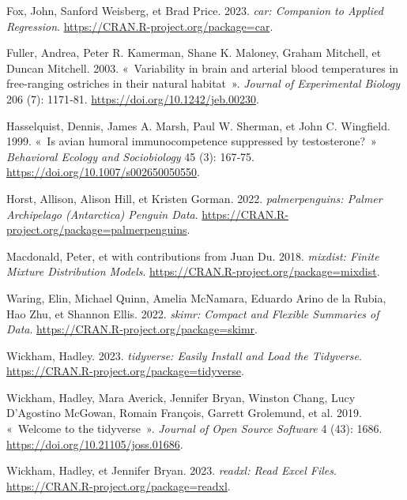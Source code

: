 \documentclass[
  a4paper,
  DIV=11,
  numbers=noendperiod,
  oneside]{scrreprt}
\newlength{\cslhangindent}
\newlength{\cslentryspacingunit} %
\newenvironment{CSLReferences}[2] %
 {%
  \setlength{\parindent}{0pt}
  \ifodd #1
  \let\oldpar\par
  \def\par{\hangindent=\cslhangindent\oldpar}
  \fi
  \setlength{\parskip}{#2\cslentryspacingunit}
 }%
 {}
\begin{document}
\hypertarget{refs}{}
\begin{CSLReferences}{1}{0}
\leavevmode{}%
Fox, John, Sanford Weisberg, et Brad Price. 2023. \emph{car: Companion
to Applied Regression}. \url{https://CRAN.R-project.org/package=car}.

\leavevmode{}%
Fuller, Andrea, Peter R. Kamerman, Shane K. Maloney, Graham Mitchell, et
Duncan Mitchell. 2003. {«~Variability in brain and arterial blood
temperatures in free-ranging ostriches in their natural habitat~»}.
\emph{Journal of Experimental Biology} 206 (7): 1171‑81.
\url{https://doi.org/10.1242/jeb.00230}.

\leavevmode{}%
Hasselquist, Dennis, James A. Marsh, Paul W. Sherman, et John C.
Wingfield. 1999. {«~Is avian humoral immunocompetence suppressed by
testosterone?~»} \emph{Behavioral Ecology and Sociobiology} 45 (3):
167‑75. \url{https://doi.org/10.1007/s002650050550}.

\leavevmode{}%
Horst, Allison, Alison Hill, et Kristen Gorman. 2022.
\emph{palmerpenguins: Palmer Archipelago (Antarctica) Penguin Data}.
\url{https://CRAN.R-project.org/package=palmerpenguins}.

\leavevmode{}%
Macdonald, Peter, et with contributions from Juan Du. 2018.
\emph{mixdist: Finite Mixture Distribution Models}.
\url{https://CRAN.R-project.org/package=mixdist}.

\leavevmode{}%
Waring, Elin, Michael Quinn, Amelia McNamara, Eduardo Arino de la Rubia,
Hao Zhu, et Shannon Ellis. 2022. \emph{skimr: Compact and Flexible
Summaries of Data}. \url{https://CRAN.R-project.org/package=skimr}.

\leavevmode{}%
Wickham, Hadley. 2023. \emph{tidyverse: Easily Install and Load the
Tidyverse}. \url{https://CRAN.R-project.org/package=tidyverse}.

\leavevmode{}%
Wickham, Hadley, Mara Averick, Jennifer Bryan, Winston Chang, Lucy
D'Agostino McGowan, Romain François, Garrett Grolemund, et al. 2019.
{«~Welcome to the {tidyverse}~»}. \emph{Journal of Open Source Software}
4 (43): 1686. \url{https://doi.org/10.21105/joss.01686}.

\leavevmode{}%
Wickham, Hadley, et Jennifer Bryan. 2023. \emph{readxl: Read Excel
Files}. \url{https://CRAN.R-project.org/package=readxl}.


\end{CSLReferences}
\end{document}

